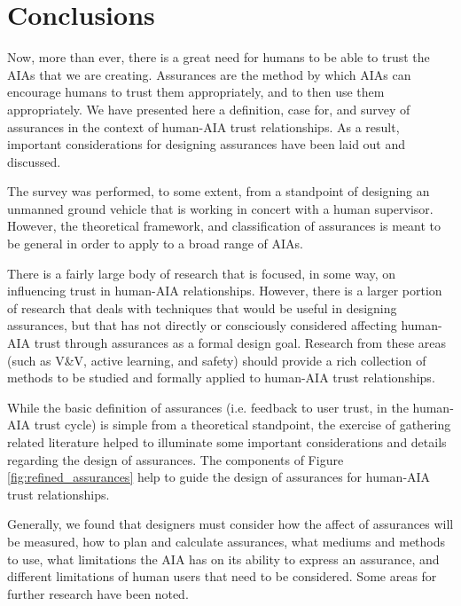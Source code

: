 \section{Conclusions}\label{sec:conclusions}
    Now, more than ever, there is a great need for humans to be able to trust the AIAs that we are creating. Assurances are the method by which AIAs can encourage humans to trust them appropriately, and to then use them appropriately. We have presented here a definition, case for, and survey of assurances in the context of human-AIA trust relationships. As a result, important considerations for designing assurances have been laid out and discussed.
    
    The survey was performed, to some extent, from a standpoint of designing an unmanned ground vehicle that is working in concert with a human supervisor. However, the theoretical framework, and classification of assurances is meant to be general in order to apply to a broad range of AIAs.

    There is a fairly large body of research that is focused, in some way, on influencing trust in human-AIA relationships. However, there is a larger portion of research that deals with techniques that would be useful in designing assurances, but that has not directly or consciously considered affecting human-AIA trust through assurances as a formal design goal. Research from these areas (such as V\&V, active learning, and safety) should provide a rich collection of methods to be studied and formally applied to human-AIA trust relationships.

    While the basic definition of assurances (i.e. feedback to user trust, in the human-AIA trust cycle) is simple from a theoretical standpoint, the exercise of gathering related literature helped to illuminate some important considerations and details regarding the design of assurances. The components of Figure \ref{fig:refined_assurances} help to guide the design of assurances for human-AIA trust relationships.

    Generally, we found that designers must consider how the affect of assurances will be measured, how to plan and calculate assurances, what mediums and methods to use, what limitations the AIA has on its ability to express an assurance, and different limitations of human users that need to be considered. Some areas for further research have been noted.

    

\newpage


